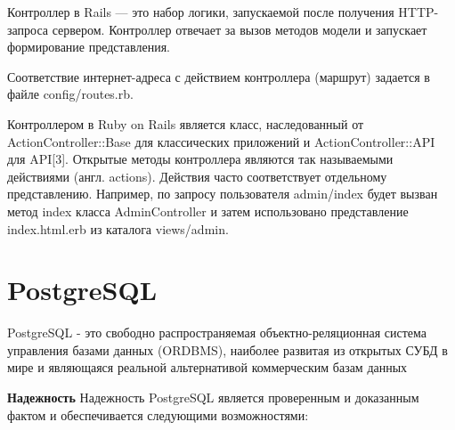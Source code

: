 Контроллер в Rails — это набор логики, запускаемой после получения HTTP-запроса сервером. Контроллер отвечает за вызов методов модели и запускает формирование представления.

Соответствие интернет-адреса с действием контроллера (маршрут) задается в файле config/routes.rb.

Контроллером в Ruby on Rails является класс, наследованный от ActionController::Base для классических приложений и ActionController::API для API[3]. Открытые методы контроллера являются так называемыми действиями (англ. actions). Действия часто соответствует отдельному представлению. Например, по запросу пользователя admin/index будет вызван метод index класса AdminController и затем использовано представление index.html.erb из каталога views/admin.

\section{PostgreSQL}\label{sec:ch3/sect3}
PostgreSQL - это свободно распространяемая объектно-реляционная система управления базами данных (ORDBMS), наиболее развитая из открытых СУБД в мире и являющаяся реальной альтернативой коммерческим базам данных

\textbf{Надежность} 
Надежность PostgreSQL является проверенным и доказанным фактом и обеспечивается следующими возможностями:


